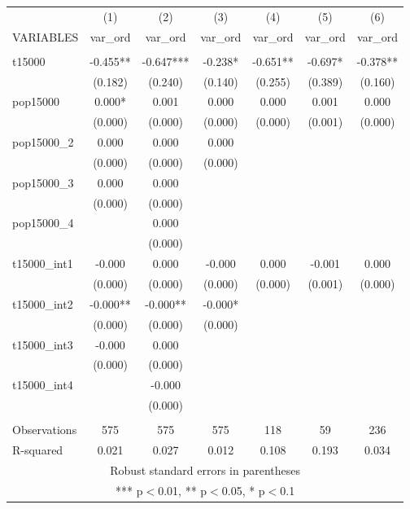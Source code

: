 \documentclass[]{article}
\begin{document}
\begin{tabular}{lcccccc} \hline
 & (1) & (2) & (3) & (4) & (5) & (6) \\
VARIABLES & var\_ord & var\_ord & var\_ord & var\_ord & var\_ord & var\_ord \\ \hline
 &  &  &  &  &  &  \\
t15000 & -0.455** & -0.647*** & -0.238* & -0.651** & -0.697* & -0.378** \\
 & (0.182) & (0.240) & (0.140) & (0.255) & (0.389) & (0.160) \\
pop15000 & 0.000* & 0.001 & 0.000 & 0.000 & 0.001 & 0.000 \\
 & (0.000) & (0.000) & (0.000) & (0.000) & (0.001) & (0.000) \\
pop15000\_2 & 0.000 & 0.000 & 0.000 &  &  &  \\
 & (0.000) & (0.000) & (0.000) &  &  &  \\
pop15000\_3 & 0.000 & 0.000 &  &  &  &  \\
 & (0.000) & (0.000) &  &  &  &  \\
pop15000\_4 &  & 0.000 &  &  &  &  \\
 &  & (0.000) &  &  &  &  \\
t15000\_int1 & -0.000 & 0.000 & -0.000 & 0.000 & -0.001 & 0.000 \\
 & (0.000) & (0.000) & (0.000) & (0.000) & (0.001) & (0.000) \\
t15000\_int2 & -0.000** & -0.000** & -0.000* &  &  &  \\
 & (0.000) & (0.000) & (0.000) &  &  &  \\
t15000\_int3 & -0.000 & 0.000 &  &  &  &  \\
 & (0.000) & (0.000) &  &  &  &  \\
t15000\_int4 &  & -0.000 &  &  &  &  \\
 &  & (0.000) &  &  &  &  \\
 &  &  &  &  &  &  \\
Observations & 575 & 575 & 575 & 118 & 59 & 236 \\
 R-squared & 0.021 & 0.027 & 0.012 & 0.108 & 0.193 & 0.034 \\ \hline
\multicolumn{7}{c}{ Robust standard errors in parentheses} \\
\multicolumn{7}{c}{ *** p$<$0.01, ** p$<$0.05, * p$<$0.1} \\
\end{tabular}
\end{document}
